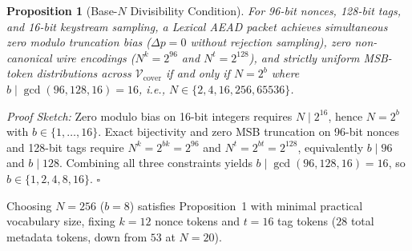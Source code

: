 \documentclass[conference]{IEEEtran}
\newtheorem{proposition}{Proposition}
\begin{document}
\begin{proposition}[Base-$N$ Divisibility Condition]
For 96-bit nonces, 128-bit tags, and 16-bit keystream sampling, a Lexical AEAD packet achieves simultaneous zero modulo truncation bias ($\Delta p = 0$ without rejection sampling), zero non-canonical wire encodings ($N^k = 2^{96}$ and $N^t = 2^{128}$), and strictly uniform MSB-token distributions across $\mathcal{V}_{\text{cover}}$ if and only if $N = 2^b$ where $b \mid \gcd(96, 128, 16) = 16$, i.e., $N \in \{2, 4, 16, 256, 65536\}$.
\end{proposition}

\textit{Proof Sketch:} Zero modulo bias on 16-bit integers requires $N \mid 2^{16}$, hence $N = 2^b$ with $b \in \{1, \dots, 16\}$. Exact bijectivity and zero MSB truncation on 96-bit nonces and 128-bit tags require $N^k = 2^{bk} = 2^{96}$ and $N^t = 2^{bt} = 2^{128}$, equivalently $b \mid 96$ and $b \mid 128$. Combining all three constraints yields $b \mid \gcd(96, 128, 16) = 16$, so $b \in \{1, 2, 4, 8, 16\}$. $\square$

Choosing $N = 256$ ($b = 8$) satisfies Proposition~1 with minimal practical vocabulary size, fixing $k = 12$ nonce tokens and $t = 16$ tag tokens ($28$ total metadata tokens, down from $53$ at $N=20$).
\end{document}
